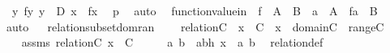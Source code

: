 \begin{isabellebody}
\ {\isachardoublequoteopen}{\isacharparenleft}{\kern0pt}{\isacharbraceleft}{\kern0pt}\ {\isacharless}{\kern0pt}y{\isacharcomma}{\kern0pt}\ f{\isacharparenleft}{\kern0pt}y{\isacharparenright}{\kern0pt}{\isachargreater}{\kern0pt}{\isachardot}{\kern0pt}\ y\ {\isasymin}\ D\ {\isacharbraceright}{\kern0pt}{\isacharparenright}{\kern0pt}{\isacharbackquote}{\kern0pt}x\ {\isacharequal}{\kern0pt}\ f{\isacharparenleft}{\kern0pt}x{\isacharparenright}{\kern0pt}{\isachardoublequoteclose}\ \isamarkupfalse%
\ p{}\ \isamarkupfalse%
\ auto\ \isanewline
{}\isamarkupfalse%
%
\endisatagproof
{\isafoldproof}%
%
\isadelimproof
\isanewline
%
\endisadelimproof
\isanewline
{}\isamarkupfalse%
\ function{\isacharunderscore}{\kern0pt}value{\isacharunderscore}{\kern0pt}in\ {\isacharcolon}{\kern0pt}\ {\isachardoublequoteopen}f\ {\isasymin}\ A\ {\isasymrightarrow}\ B\ {\isasymLongrightarrow}\ a\ {\isasymin}\ A\ {\isasymLongrightarrow}\ f{\isacharbackquote}{\kern0pt}a\ {\isasymin}\ B{\isachardoublequoteclose}\ \isanewline
%
\isadelimproof
\ \ %
\endisadelimproof
%
\isatagproof
{}\isamarkupfalse%
\ auto%
\endisatagproof
{\isafoldproof}%
%
\isadelimproof
\ \isanewline
%
\endisadelimproof
\isanewline
{}\isamarkupfalse%
\ relation{\isacharunderscore}{\kern0pt}subset{\isacharunderscore}{\kern0pt}domran\ {\isacharcolon}{\kern0pt}\ \isanewline
\ \ {\isachardoublequoteopen}relation{\isacharparenleft}{\kern0pt}C{\isacharparenright}{\kern0pt}\ {\isasymLongrightarrow}\ x\ {\isasymin}\ C\ {\isasymLongrightarrow}\ x\ {\isasymin}\ domain{\isacharparenleft}{\kern0pt}C{\isacharparenright}{\kern0pt}\ {\isasymtimes}\ range{\isacharparenleft}{\kern0pt}C{\isacharparenright}{\kern0pt}{\isachardoublequoteclose}\ \isanewline
%
\isadelimproof
%
\endisadelimproof
%
\isatagproof
{}\isamarkupfalse%
\ {\isacharminus}{\kern0pt}\ \isanewline
\ \ \isamarkupfalse%
\ assms{\isacharcolon}{\kern0pt}\ {\isachardoublequoteopen}relation{\isacharparenleft}{\kern0pt}C{\isacharparenright}{\kern0pt}{\isachardoublequoteclose}\ {\isachardoublequoteopen}x\ {\isasymin}\ C{\isachardoublequoteclose}\isanewline
\ \ \isamarkupfalse%
\ \isamarkupfalse%
\ a\ b\ \ abh{\isacharcolon}{\kern0pt}\ {\isachardoublequoteopen}x\ {\isacharequal}{\kern0pt}\ {\isacharless}{\kern0pt}a{\isacharcomma}{\kern0pt}\ b{\isachargreater}{\kern0pt}{\isachardoublequoteclose}\ \isamarkupfalse%
\ relation{\isacharunderscore}{\kern0pt}def\ \isamarkupfalse%

\end{isabellebody}
